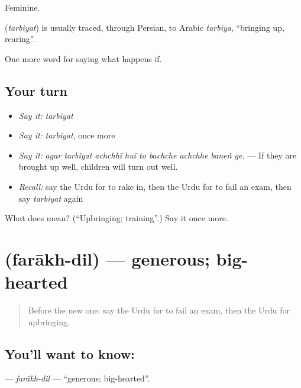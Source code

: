 Feminine.

\begin{cousinweb}
\textbf{} (\emph{tarbiyat}) is usually traced, through Persian, to Arabic \emph{tarbiya}, \textquotedblleft{}bringing up, rearing\textquotedblright{}.
\end{cousinweb}

\begin{grammarlens}[title={What you've built}]
One more word for saying what happens if.
\end{grammarlens}

\subsection*{Your turn}
\begin{itemize}
\raggedright
  \item \emph{Say it:} \emph{tarbiyat}
  \item \emph{Say it:} \emph{tarbiyat}, once more
  \item \emph{Say it:} \emph{agar tarbiyat achchhī huī to bachche achchhe baneṅ ge.} — If they are brought up well, children will turn out well.
  \item \emph{Recall:} say the Urdu for to rake in, then the Urdu for to fail an exam, then say \emph{tarbiyat} again
\end{itemize}

\begin{tcolorbox}[breakable,colback=teal!4,colframe=teal!35!black,title={Before you move on}]
What does  mean? (\textquotedblleft{}Upbringing; training\textquotedblright{}.) Say it once more.
\end{tcolorbox}
\section[\texorpdfstring{\ur{فراخ} \ur{دل} (farākh-dil)}{فراخ دل (farākh-dil)}]{  (farākh-dil) — generous; big-hearted}

\label{lesson:UR-C384-farakh-dil}



\begin{quote}
Before the new one: say the Urdu for to fail an exam, then the Urdu for upbringing.
\end{quote}

\subsection*{You'll want to know:  }
\textbf{ } — \emph{farākh-dil} — \textquotedblleft{}generous; big-hearted\textquotedblright{}.

